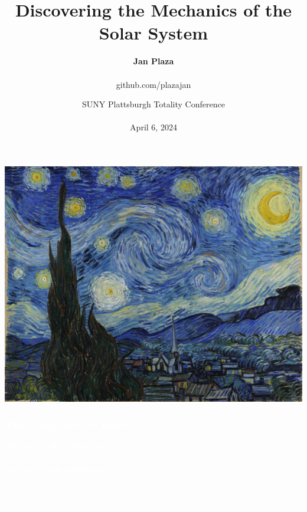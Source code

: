\documentclass[aspectratio=169,xcolor=pdftex,dvipsnames]{beamer} %
\title{\textbf{Discovering the Mechanics of the Solar System}}
\author{\textbf{\Large Jan Plaza}\\ \ \\
github.com/plazajan}
\date{SUNY Plattsburgh Totality Conference\\ \ \\ April 6, 2024
}
\begin{document}

{
{
    \includegraphics[width=\paperwidth]{vanGoghStarryNight.jpg}
}
\begin{frame}
\frametitle{\textcolor{white}{\textbf{Two things awe me most:}}}
 
 \textcolor{white}{
{\Huge\textbf{the starry sky above me,\\ \ \\
the moral law within me.}
\ \\ \ \\ \ \\
Immanuel Kant
}}

\end{frame}
}


\maketitle


% 
%
%
\end{document}

